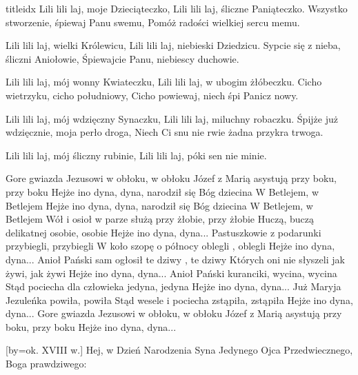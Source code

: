 \documentclass[a5paper, portrait, 12pt]{mwart}
\begin{document}
\begin{songs}{titleidx}
        Lili lili laj, moje Dzieciąteczko,
        Lili lili laj, śliczne Paniąteczko.
\endverse
\beginverse
    Wszystko stworzenie, śpiewaj Panu swemu,
    Pomóż radości wielkiej sercu memu.

        Lili lili laj, wielki Królewicu,
        Lili lili laj, niebieski Dziedzicu.
\endverse
\beginverse
    Sypcie się z nieba, śliczni Aniołowie,
    Śpiewajcie Panu, niebiescy duchowie.

        Lili lili laj, mój wonny Kwiateczku,
        Lili lili laj, w ubogim żłóbeczku.
\endverse
\beginverse
    Cicho wietrzyku, cicho południowy,
    Cicho powiewaj, niech śpi Panicz nowy.

        Lili lili laj, mój wdzięczny Synaczku,
        Lili lili laj, miluchny robaczku.
\endverse
\beginverse
    Śpijże już wdzięcznie, moja perło droga,
    Niech Ci snu nie rwie żadna przykra trwoga.

        Lili lili laj, mój śliczny rubinie,
        Lili lili laj, póki sen nie minie.
\endverse
\endsong


\beginverse
Gore gwiazda Jezusowi w obłoku, w obłoku
Józef z Marią asystują przy boku, przy boku
\endverse
\beginchorus
Hejże ino dyna, dyna, narodził się Bóg dziecina
W Betlejem, w Betlejem
Hejże ino dyna, dyna, narodził się Bóg dziecina
W Betlejem, w Betlejem
\endchorus
\beginverse
Wół i osioł w parze służą przy żłobie, przy żłobie
Huczą, buczą delikatnej osobie, osobie
\endverse
\beginchorus
Hejże ino dyna, dyna...
\endchorus
\beginverse
Pastuszkowie z podarunki przybiegli, przybiegli
W koło szopę o północy oblegli , oblegli
\endverse
\beginchorus
Hejże ino dyna, dyna...
\endchorus
\beginverse
Anioł Pański sam ogłosił te dziwy , te dziwy
Których oni nie słyszeli jak żywi, jak żywi
\endverse
\beginchorus
Hejże ino dyna, dyna...
\endchorus
\beginverse
Anioł Pański kuranciki, wycina, wycina
Stąd pociecha dla człowieka jedyna, jedyna
\endverse
\beginchorus
Hejże ino dyna, dyna...
\endchorus
\beginverse
Już Maryja Jezuleńka powiła, powiła
Stąd wesele i pociecha zstąpiła, zstąpiła
\endverse
\beginchorus
Hejże ino dyna, dyna...
\endchorus
\beginverse
Gore gwiazda Jezusowi w obłoku, w obłoku
Józef z Marią asystują przy boku, przy boku
\endverse
\beginchorus
Hejże ino dyna, dyna...
\endchorus
\endsong


[by={ok. XVIII w.}]
\beginverse
    Hej, w Dzień Narodzenia Syna Jedynego
    Ojca Przedwiecznego, Boga prawdziwego:
\endverse		


\end{songs}
\end{document}
